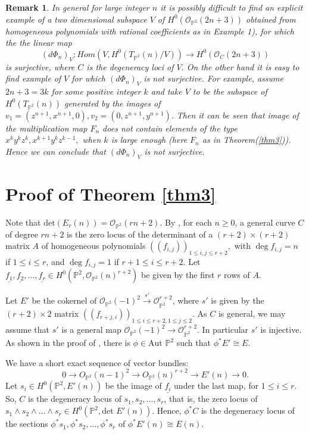 \documentclass[11pt]{amsart}
\newtheorem{rem}[subsection]{Remark}
\theoremstyle{definition}
\begin{document}
\begin{rem}
    In general for large integer $n$ it is possibly difficult to find an 
    explicit example of  
    a two dimensional subspace $V$ of $H^0(\mathcal{O}_{\mathbb{P}^2}
    (2n+3))$ 
    obtained from  homogeneous polynomials with rational coefficients as 
    in Example 
    1), for which the the linear map 
    \[(d\Phi_n)_V: Hom(V,H^0(T_{\mathbb{P}^2}(n)/V)) \to 
    H^0(\mathcal O_{C}(2n+3))  \]
    is surjective, where $C$ is the degeneracy loci of $V.$ 
    On the other hand it is 
    easy to find example of $V$ for which $(d\Phi_n)_V$ is not 
    surjective. For example, assume  $2n+3 = 3k$ for some 
    positive integer $k$ and take $V$ to be
    the subspace of $H^0(T_{\mathbb{P}^2}(n))$ generated by the images 
    of $v_1= (z^{n+1}, x^{n+1}, 0), v_2= (0, z^{n+1}, y^{n+1}).$ 
    Then it can be seen that
    image of the multiplication map $F_n$  does not contain elements of
    the type
    $x^ky^kz^k, x^{k+1}y^kz^{k-1},$ when $k$ is large 
    enough (here $F_n$ as in Theorem(\ref{thm3})). 
    Hence we can conclude that $(d\Phi_n)_V$ is not surjective.
    \end{rem}
\section{Proof of Theorem \ref{thm3}}
 Note that $\textrm{det}(E_r(n))=\mathcal{O}_{\mathbb{P}^2}(rn+2)$. 
 By \cite{LuJu}, for each $n\geq 0$, a general curve $C$ 
 of degree $rn+2$ is the zero locus of the 
 determinant of a $(r+2)\times(r+2)$ matrix $A$ of homogeneous
 polynomials $((f_{i,j}))_{1\leq i,j\leq r+2},$ 
 with $\deg f_{i,j}=n$ if $1\leq i\leq r$, and 
 $\deg f_{i,j}=1$ if $r+1\leq i\leq r+2$. Let 
 $\underline{f_1},\underline{f_2},...,\underline{f_r}
 \in H^0(\mathbb{P}^2,\mathcal{O}_{\mathbb{P}^2}(n)^{r+2})$ 
 be given by the first $r$ rows of $A$. 

 Let $E'$ be the cokernel of $\mathcal{O}_{\mathbb{P}^2}
 (-1)^{2}\xrightarrow{s'}\mathcal{O}_{\mathbb{P}^2}^{r+2}$, where $s'$
is given by the $(r+2)\times 2$ matrix 
$((f_{r+j,i}))_{1\leq i\leq r+2, 1\leq j\leq 2}.$ 
As $C$ is general, we may assume that $s'$ is a general map 
$\mathcal{O}_{\mathbb{P}^2}(-1)^{2}\to\mathcal{O}_{\mathbb{P}^2}^{r+2}$.
In particular $s'$ is injective. As shown in the proof of 
{\cite[Theorem 5.2]{BSV}},
there is $\phi\in\textrm{Aut }\mathbb{P}^2$ such that 
$\phi^* E'\cong E.$

We have a short exact sequence of vector bundles:
\[ 0 \to O_{\mathbb{P}^2}(n-1)^2{\longrightarrow} O_{\mathbb{P}^2}
(n)^{r+2}{\to} E'(n) \to 0. \]
Let $s_i\in H^0(\mathbb{P}^2,E'(n))$ be the image of 
$\underline{f_i}$ under the last
map, for $1\leq i\leq r.$ So, $C$ is the degeneracy locus of 
$s_1,s_2,...,s_r$, that
is, the zero locus of $s_1\wedge s_2\wedge...\wedge s_r\in 
H^0(\mathbb{P}^2,\textrm{det }E'(n))$. Hence, $\phi^*C$ is 
the degeneracy locus of the sections 
$\phi^*s_1,\phi^*s_2,...,\phi^*s_r$ of $\phi^* E'(n)\cong E(n).$
\end{document}
